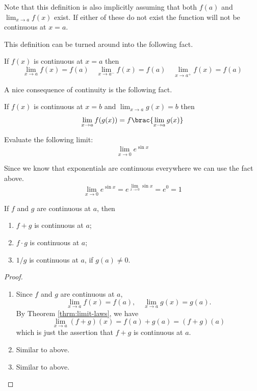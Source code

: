 Note that this definition is also implicitly assuming that both $f(a)$ and $\lim_{x\to a}f(x)$ exist. If either of these do not exist the function will not be continuous at $x=a$.

This definition can be turned around into the following fact.
\begin{corollary}
If $f(x)$ is continuous at $x=a$ then
\[ \lim_{x \to a} f(x) = f(a) \quad \lim_{x \to a^-} f(x) = f(a) \quad \lim_{x \to a^+} f(x) = f(a) \]
\end{corollary}

A nice consequence of continuity is the following fact.
\begin{corollary}
If $f(x)$ is continuous at $x=b$ and $\lim_{x\to a}g(x)=b$ then
\[ \lim_{x \to a} f(g(x)) = f\brac{\lim_{x \to a} g(x)} \]
\end{corollary}

\begin{exercise}
Evaluate the following limit:
\[ \lim_{x \to 0} e^{\sin x} \]
\end{exercise}

\begin{solution}
Since we know that exponentials are continuous everywhere we can use the fact above.
\[ \lim_{x \to 0} e^{\sin x} = e^{\lim_{x \to 0} \sin x} = e^0 = \boxed{1} \]
\end{solution}

\begin{theorem}
If $f$ and $g$ are continuous at $a$, then
\begin{enumerate}[label=(\arabic*)]
\item $f+g$ is continuous at $a$;
\item $f\cdot g$ is continuous at $a$;
\item $1/g$ is continuous at $a$, if $g(a)\neq0$.
\end{enumerate}
\end{theorem}

\begin{proof} \
\begin{enumerate}[label=(\arabic*)]
\item Since $f$ and $g$ are continuous at $a$,
\[\lim_{x\to a}f(x)=f(a),\quad\lim_{x\to a}g(x)=g(a).\]
By Theorem \ref{thrm:limit-laws}, we have
\[\lim_{x\to a}(f+g)(x)=f(a)+g(a)=(f+g)(a)\]
which is just the assertion that $f+g$ is continuous at $a$.
\item Similar to above.
\item Similar to above.
\end{enumerate}
\end{proof}

